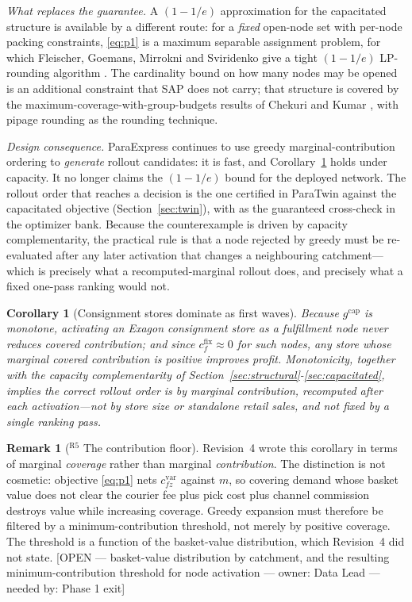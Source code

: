 \documentclass[10pt,twocolumn,letterpaper]{article}
\newtheorem{corollary}{Corollary}
\theoremstyle{definition}
\newtheorem{remark}{Remark}
\newcommand{\OPEN}[3]{{\color{openred}\footnotesize\textsf{[OPEN --- #1 --- owner: #2 --- needed by: #3]}}}
\begin{document}
\emph{What replaces the guarantee.} A $(1-1/e)$ approximation for the capacitated structure is available by a different route: for a \emph{fixed} open-node set with per-node packing constraints, \eqref{eq:p1} is a maximum separable assignment problem, for which Fleischer, Goemans, Mirrokni and Sviridenko give a tight $(1-1/e)$ LP-rounding algorithm \cite{fleischer2011}. The cardinality bound on how many nodes may be opened is an additional constraint that SAP does not carry; that structure is covered by the maximum-coverage-with-group-budgets results of Chekuri and Kumar \cite{chekuri2004}, with pipage rounding \cite{ageev2004} as the rounding technique.

\emph{Design consequence.} ParaExpress continues to use greedy marginal-contribution ordering to \emph{generate} rollout candidates: it is fast, and Corollary~\ref{cor:stores} holds under capacity. It no longer claims the $(1-1/e)$ bound for the deployed network. The rollout order that reaches a decision is the one certified in ParaTwin against the capacitated objective (Section~\ref{sec:twin}), with \cite{chekuri2004,fleischer2011} as the guaranteed cross-check in the optimizer bank. Because the counterexample is driven by capacity complementarity, the practical rule is that a node rejected by greedy must be re-evaluated after any later activation that changes a neighbouring catchment---which is precisely what a recomputed-marginal rollout does, and precisely what a fixed one-pass ranking would not.

\begin{corollary}[Consignment stores dominate as first waves]\label{cor:stores}
Because $g^{\mathrm{cap}}$ is monotone, activating an Exagon consignment store as a fulfillment node never reduces covered contribution; and since $c^{\mathrm{fix}}_f\approx0$ for such nodes, any store whose marginal covered contribution is positive improves profit. Monotonicity, together with the capacity complementarity of Section~\ref{sec:structural}-\ref{sec:capacitated}, implies the correct rollout order is by marginal \emph{contribution}, recomputed after each activation---not by store size or standalone retail sales, and not fixed by a single ranking pass.
\end{corollary}

\begin{remark}[$^{\mathrm{R5}}$ The contribution floor]
Revision~4 wrote this corollary in terms of marginal \emph{coverage} rather than marginal \emph{contribution}. The distinction is not cosmetic: objective \eqref{eq:p1} nets $c^{\mathrm{var}}_{fz}$ against $m$, so covering demand whose basket value does not clear the courier fee plus pick cost plus channel commission destroys value while increasing coverage. Greedy expansion must therefore be filtered by a minimum-contribution threshold, not merely by positive coverage. The threshold is a function of the basket-value distribution, which Revision~4 did not state. \OPEN{basket-value distribution by catchment, and the resulting minimum-contribution threshold for node activation}{Data Lead}{Phase 1 exit}
\end{remark}
\end{document}
